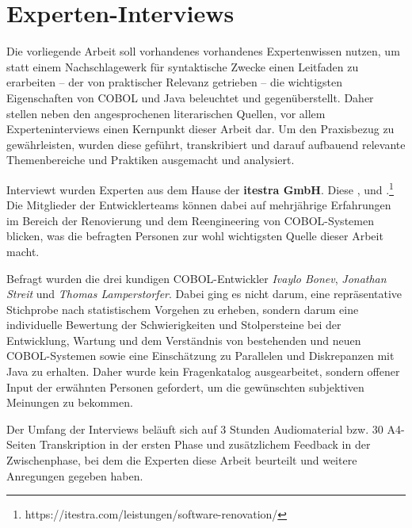 \section{Experten-Interviews}\label{interviews}
Die vorliegende Arbeit soll vorhandenes vorhandenes Expertenwissen nutzen, um statt einem Nachschlagewerk für syntaktische Zwecke einen Leitfaden zu erarbeiten -- der von praktischer Relevanz getrieben -- die wichtigsten Eigenschaften von COBOL und Java beleuchtet und gegenüberstellt. Daher stellen neben den angesprochenen literarischen Quellen, vor allem Experteninterviews einen Kernpunkt dieser Arbeit dar. Um den Praxisbezug zu gewährleisten, wurden diese geführt, transkribiert und darauf aufbauend relevante Themenbereiche und Praktiken ausgemacht und analysiert.

Interviewt wurden Experten aus dem Hause der \textbf{itestra GmbH}. Diese ,  und .\footnote{\label{itestraFootnote}https://itestra.com/leistungen/software-renovation/} Die Mitglieder der Entwicklerteams können dabei auf mehrjährige Erfahrungen im Bereich der Renovierung und dem Reengineering von COBOL-Systemen blicken, was die befragten Personen zur wohl wichtigsten Quelle dieser Arbeit macht.

Befragt wurden die drei kundigen COBOL-Entwickler \textit{Ivaylo Bonev}, \textit{Jonathan Streit} und \textit{Thomas Lamperstorfer}. Dabei ging es nicht darum, eine repräsentative Stichprobe nach statistischem Vorgehen zu erheben, sondern darum eine individuelle Bewertung der Schwierigkeiten und Stolpersteine bei der Entwicklung, Wartung und dem Verständnis von bestehenden und neuen COBOL-Systemen sowie eine Einschätzung zu Parallelen und Diskrepanzen mit Java zu erhalten. Daher wurde kein Fragenkatalog ausgearbeitet, sondern offener Input der erwähnten Personen gefordert, um die gewünschten subjektiven Meinungen zu bekommen. 

Der Umfang der Interviews beläuft sich auf 3 Stunden Audiomaterial bzw. 30 A4-Seiten Transkription in der ersten Phase und zusätzlichem Feedback in der Zwischenphase, bei dem die Experten diese Arbeit beurteilt und weitere Anregungen gegeben haben.